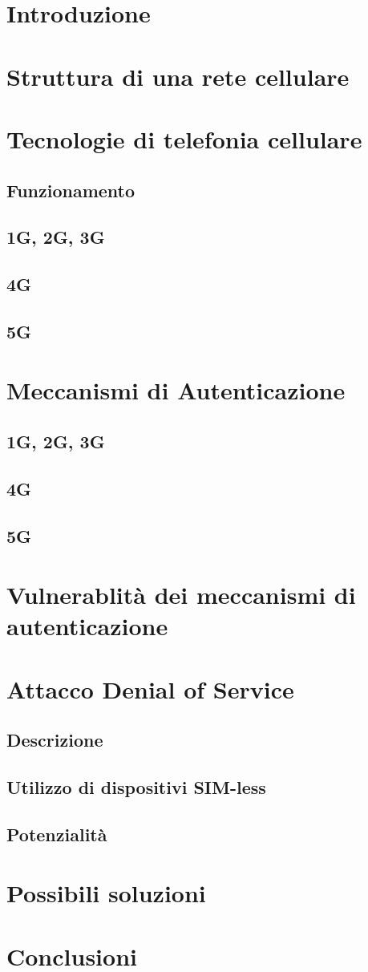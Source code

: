 \documentclass{article}
\begin{document}

\section{Introduzione}
\section{Struttura di una rete cellulare}
\section{Tecnologie di telefonia cellulare}
\subsection{Funzionamento}
\subsection{1G, 2G, 3G}
\subsection{4G}
\subsection{5G}
\section{Meccanismi di Autenticazione}
\subsection{1G, 2G, 3G}
\subsection{4G}
\subsection{5G}
\section{Vulnerablità dei meccanismi di autenticazione}
\section{Attacco Denial of Service}
\subsection{Descrizione}
\subsection{Utilizzo di dispositivi SIM-less}
\subsection{Potenzialità}
\section{Possibili soluzioni}
\section{Conclusioni}
\end{document}
